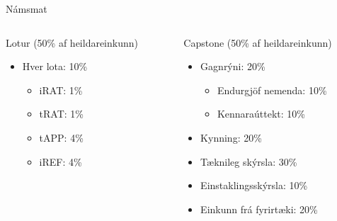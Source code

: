 \documentclass[
    NAME={Dr. Helga Ingimundardóttir},
    EMAIL={helgaingim@hi.is},
    FACULTY={Iðnaðarverkfræði},
    TITLE={Hagnýt hæfni í brennidepli},
    SUBTITLE={Endurskoðun á námskeiði í Viðskiptagreind},
    SEMINAR={Ráðstefna kennsluakademíunnar},
    DATE={22 nóvember, 2024},
    WIDE={true},
    ICELANDIC={true}
]{HI-LaTeX/hi-beamer}
\begin{document}
\begin{frame}{Námsmat}
    \begin{columns}[T] %
        \begin{column}{.48\textwidth}
            \begin{block}{Lotur (50\% af heildareinkunn)}
                \begin{itemize}
                    \item Hver lota: 10\%
                    \begin{itemize}
                        \item iRAT: 1\%
                        \item tRAT: 1\%
                        \item tAPP: 4\%
                        \item iREF: 4\%
                    \end{itemize}
                \end{itemize}
            \end{block}
        \end{column}%
        \hfill%
        \begin{column}{.48\textwidth}
            \begin{block}{Capstone (50\% af heildareinkunn)}
                \begin{itemize}
                    \item Gagnrýni: 20\%
                    \begin{itemize}
                        \item Endurgjöf nemenda: 10\%
                        \item Kennaraúttekt: 10\%
                    \end{itemize}
                    \item Kynning: 20\%
                    \item Tæknileg skýrsla: 30\%
                    \item Einstaklingsskýrsla: 10\%
                    \item Einkunn frá fyrirtæki: 20\%
                \end{itemize}
            \end{block}
        \end{column}%
    \end{columns}
\end{frame}
\end{document}
